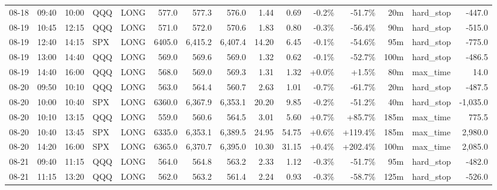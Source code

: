 \documentclass[11pt,a4paper,twoside]{article}
\begin{document}
\begin{landscape}
\begin{center}
\begin{longtable}{>{\color{txtmain}}l l l l l r r r r r r r r >{\color{txtmain}}l r}
08-18 & 09:40 & 10:00 & QQQ & LONG & 577.0 & 577.3 & 576.0 & 1.44 & 0.69 & \textcolor{lossred}{-0.2\%} & \textcolor{lossred}{-51.7\%} & 20m & hard\_stop & \textcolor{lossred}{-447.0} \\
08-19 & 10:45 & 12:15 & QQQ & LONG & 571.0 & 572.0 & 570.6 & 1.83 & 0.80 & \textcolor{lossred}{-0.3\%} & \textcolor{lossred}{-56.4\%} & 90m & hard\_stop & \textcolor{lossred}{-515.0} \\
08-19 & 12:40 & 14:15 & SPX & LONG & 6405.0 & 6,415.2 & 6,407.4 & 14.20 & 6.45 & \textcolor{lossred}{-0.1\%} & \textcolor{lossred}{-54.6\%} & 95m & hard\_stop & \textcolor{lossred}{-775.0} \\
08-19 & 13:00 & 14:40 & QQQ & LONG & 569.0 & 569.6 & 569.0 & 1.32 & 0.62 & \textcolor{lossred}{-0.1\%} & \textcolor{lossred}{-52.7\%} & 100m & hard\_stop & \textcolor{lossred}{-486.5} \\
08-19 & 14:40 & 16:00 & QQQ & LONG & 568.0 & 569.0 & 569.3 & 1.31 & 1.32 & \textcolor{wingreen}{+0.0\%} & \textcolor{wingreen}{+1.5\%} & 80m & max\_time & \textcolor{wingreen}{14.0} \\
08-20 & 09:50 & 10:10 & QQQ & LONG & 563.0 & 564.4 & 560.7 & 2.63 & 1.01 & \textcolor{lossred}{-0.7\%} & \textcolor{lossred}{-61.7\%} & 20m & hard\_stop & \textcolor{lossred}{-487.5} \\
08-20 & 10:00 & 10:40 & SPX & LONG & 6360.0 & 6,367.9 & 6,353.1 & 20.20 & 9.85 & \textcolor{lossred}{-0.2\%} & \textcolor{lossred}{-51.2\%} & 40m & hard\_stop & \textcolor{lossred}{-1,035.0} \\
08-20 & 10:10 & 13:15 & QQQ & LONG & 559.0 & 560.6 & 564.5 & 3.01 & 5.60 & \textcolor{wingreen}{+0.7\%} & \textcolor{wingreen}{+85.7\%} & 185m & max\_time & \textcolor{wingreen}{775.5} \\
08-20 & 10:40 & 13:45 & SPX & LONG & 6335.0 & 6,353.1 & 6,389.5 & 24.95 & 54.75 & \textcolor{wingreen}{+0.6\%} & \textcolor{wingreen}{+119.4\%} & 185m & max\_time & \textcolor{wingreen}{2,980.0} \\
08-20 & 14:20 & 16:00 & SPX & LONG & 6365.0 & 6,370.7 & 6,395.0 & 10.30 & 31.15 & \textcolor{wingreen}{+0.4\%} & \textcolor{wingreen}{+202.4\%} & 100m & max\_time & \textcolor{wingreen}{2,085.0} \\
08-21 & 09:40 & 11:15 & QQQ & LONG & 564.0 & 564.8 & 563.2 & 2.33 & 1.12 & \textcolor{lossred}{-0.3\%} & \textcolor{lossred}{-51.7\%} & 95m & hard\_stop & \textcolor{lossred}{-482.0} \\
08-21 & 11:15 & 13:20 & QQQ & LONG & 562.0 & 563.2 & 561.4 & 2.24 & 0.93 & \textcolor{lossred}{-0.3\%} & \textcolor{lossred}{-58.7\%} & 125m & hard\_stop & \textcolor{lossred}{-526.0} \\

\end{longtable}
\end{center}
\end{landscape}
\end{document}
